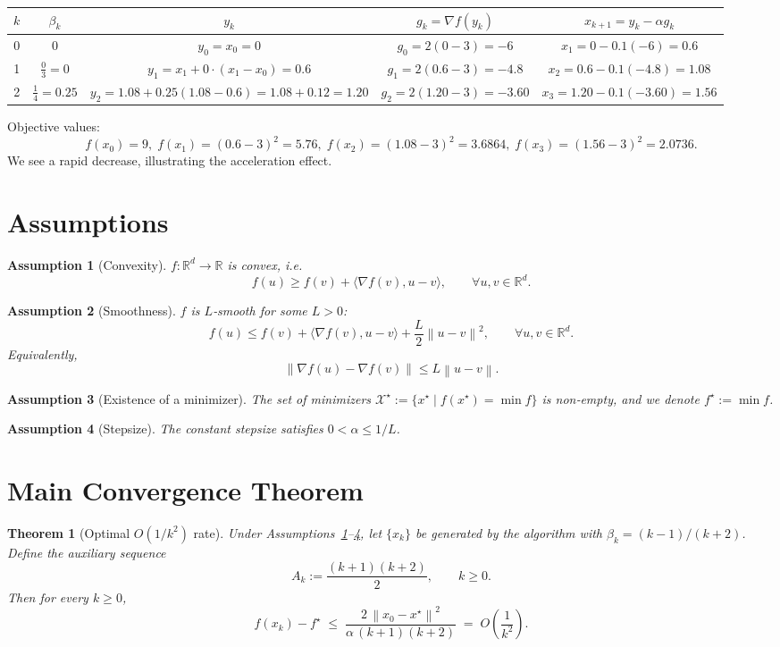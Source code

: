 \documentclass{article}
\newtheorem{theorem}{Theorem}
\newtheorem{assumption}{Assumption}
\newcommand{\norm}[1]{\left\|#1\right\|}
\newcommand{\grad}{\nabla}
\newcommand{\R}{\mathbb{R}}
\begin{document}
\begin{center}
\begin{tabular}{c|c|c|c|c}
$k$ & $\beta_k$ & $y_k$ & $g_k=\grad f(y_k)$ & $x_{k+1}=y_k-\alpha g_k$\\ \hline
0 & $0$ & $y_0 = x_0 =0$ &
$g_0 = 2(0-3) = -6$ &
$x_1 = 0 - 0.1(-6)=0.6$ \\[4pt]
1 & $\frac{0}{3}=0$ &
$y_1 = x_1 +0\cdot(x_1-x_0)=0.6$ &
$g_1 = 2(0.6-3) = -4.8$ &
$x_2 = 0.6 -0.1(-4.8)=1.08$ \\[4pt]
2 & $\frac{1}{4}=0.25$ &
$y_2 = 1.08 +0.25(1.08-0.6)=1.08+0.12=1.20$ &
$g_2 = 2(1.20-3) = -3.60$ &
$x_3 = 1.20 -0.1(-3.60)=1.56$
\end{tabular}
\end{center}

Objective values:
\[
f(x_0)=9,\; f(x_1)= (0.6-3)^2=5.76,\;
f(x_2)= (1.08-3)^2=3.6864,\;
f(x_3)= (1.56-3)^2=2.0736.
\]
We see a rapid decrease, illustrating the acceleration effect.

\section*{Assumptions}
\begin{assumption}[Convexity]\label{ass:convex}
$f:\R^d\to\R$ is convex, i.e.
\[
f(u)\ge f(v)+\langle \grad f(v),u-v\rangle ,\qquad\forall u,v\in\R^d .
\]
\end{assumption}
\begin{assumption}[Smoothness]\label{ass:smooth}
$f$ is $L$‑smooth for some $L>0$:
\[
f(u)\le f(v)+\langle \grad f(v),u-v\rangle +\frac{L}{2}\norm{u-v}^2 ,
\qquad\forall u,v\in\R^d .
\]
Equivalently,
\[
\norm{\grad f(u)-\grad f(v)}\le L\norm{u-v}.
\]
\end{assumption}
\begin{assumption}[Existence of a minimizer]\label{ass:min}
The set of minimizers $\mathcal{X}^\star:=\{x^\star\mid f(x^\star)=\min f\}$ is non‑empty,
and we denote $f^\star:=\min f$.
\end{assumption}
\begin{assumption}[Stepsize]\label{ass:stepsize}
The constant stepsize satisfies $0<\alpha\le 1/L$.
\end{assumption}

\section*{Main Convergence Theorem}
\begin{theorem}[Optimal $O(1/k^{2})$ rate]\label{thm:main}
Under Assumptions~\ref{ass:convex}–\ref{ass:stepsize},
let $\{x_k\}$ be generated by the algorithm with $\beta_k=(k-1)/(k+2)$.
Define the auxiliary sequence
\[
A_k:=\frac{(k+1)(k+2)}{2},\qquad k\ge0 .
\]
Then for every $k\ge 0$,
\[
f(x_k)-f^\star \;\le\; \frac{2\,\norm{x_0-x^\star}^2}{\alpha\,(k+1)(k+2)}
\;=\; O\!\left(\frac{1}{k^{2}}\right).
\]
\end{theorem}
\end{document}
